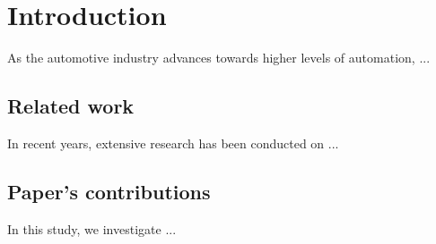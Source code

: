 \section{Introduction}
\label{sec:intro}

As the automotive industry advances towards higher levels of automation, ...

\subsection{Related work}
In recent years, extensive research has been conducted on ... 
\subsection{Paper's contributions}
In this study, we investigate ... 